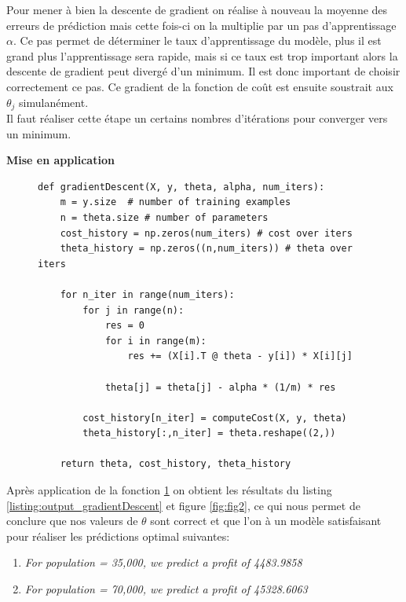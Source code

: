 Pour mener à bien la descente de gradient on réalise à nouveau la moyenne des erreurs de prédiction mais cette fois-ci on la multiplie par un pas d'apprentissage $\alpha$. Ce pas permet de déterminer le taux d'apprentissage du modèle, 
plus il est grand plus l'apprentissage sera rapide, mais si ce taux est trop important alors la descente de gradient peut divergé d'un minimum. Il est donc important de choisir correctement ce pas. Ce gradient de la fonction de coût est ensuite
soustrait aux $\theta_j$ simulanément. \\
Il faut réaliser cette étape un certains nombres d'itérations pour converger vers un minimum.

\clearpage

\vspace{.5cm}
\noindent
\textbf{Mise en application}
\vspace{.2cm}

\begin{figure}[!h]
\begin{verbatim}
def gradientDescent(X, y, theta, alpha, num_iters):  
    m = y.size  # number of training examples
    n = theta.size # number of parameters
    cost_history = np.zeros(num_iters) # cost over iters
    theta_history = np.zeros((n,num_iters)) # theta over iters

    for n_iter in range(num_iters):
        for j in range(n):
            res = 0
            for i in range(m):
                res += (X[i].T @ theta - y[i]) * X[i][j]
            
            theta[j] = theta[j] - alpha * (1/m) * res

        cost_history[n_iter] = computeCost(X, y, theta)
        theta_history[:,n_iter] = theta.reshape((2,))
    
    return theta, cost_history, theta_history
\end{verbatim}   
\label{listing:gradient_descente}
\end{figure}

Après application de la fonction \ref{listing:gradient_descente} on obtient les résultats du listing \ref{listing:output_gradientDescent} et figure \ref{fig:fig2}, ce qui nous permet de conclure que nos valeurs de $\theta$ sont correct et que l'on à un modèle satisfaisant pour 
réaliser les prédictions optimal suivantes:

\begin{enumerate}
    \item \textit{For population = 35,000, we predict a profit of 4483.9858}
    \item \textit{For population = 70,000, we predict a profit of 45328.6063}
\end{enumerate}

